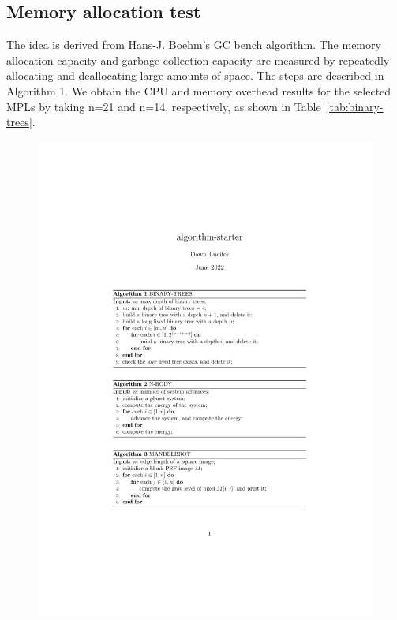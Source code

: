 \subsection{Memory allocation test}
The idea is derived from Hans-J. Boehm's GC bench algorithm.
The memory allocation capacity and garbage collection capacity are measured by repeatedly allocating and deallocating large amounts of space.
The steps are described in Algorithm 1.
We obtain the CPU and memory overhead results for the selected MPLs
by taking n=21 and n=14, respectively, as shown in Table~\ref{tab:binary-trees}.

\begin{figure}[htbp]
    \centerline{\includegraphics[scale=0.8]{figures/binary-trees}}
    \label{fig:binary-trees}
\end{figure}


